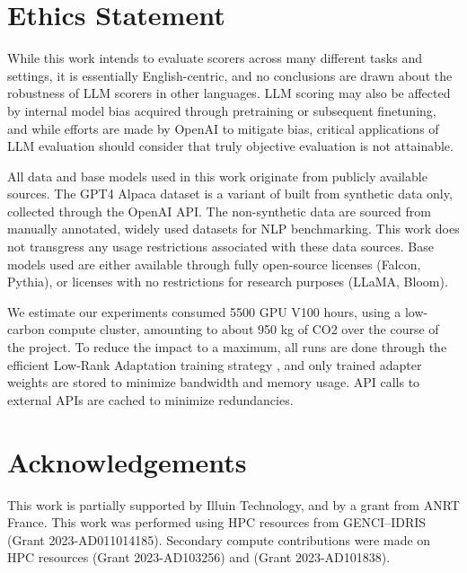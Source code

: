 \section*{Ethics Statement}

While this work intends to evaluate scorers across many different tasks and settings, it is essentially English-centric, and no conclusions are drawn about the robustness of LLM scorers in other languages. LLM scoring may also be affected by internal model bias acquired through pretraining or subsequent finetuning, and while efforts are made by OpenAI to mitigate bias, critical applications of LLM evaluation should consider that truly objective evaluation is not attainable.

All data and base models used in this work originate from publicly available sources. The GPT4 Alpaca dataset is a variant of  built from synthetic data only, collected through the OpenAI API. The non-synthetic data are sourced from manually annotated, widely used datasets for NLP benchmarking. This work does not transgress any usage restrictions associated with these data sources. Base models used are either available through fully open-source licenses (Falcon, Pythia), or licenses with no restrictions for research purposes (LLaMA, Bloom). 

We estimate our experiments consumed 5500 GPU V100 hours, using a low-carbon compute cluster, amounting to about 950 kg of CO2 over the course of the project.  To reduce the impact to a maximum, all runs are done through the efficient Low-Rank Adaptation training strategy , and only trained adapter weights are stored to minimize bandwidth and memory usage. API calls to external APIs are cached to minimize redundancies.


\section*{Acknowledgements}
This work is partially supported by Illuin Technology, and by a grant from ANRT France.
This work was performed using HPC resources from GENCI–IDRIS (Grant 2023-AD011014185).
Secondary compute contributions were made on HPC resources (Grant 2023-AD103256) and (Grant 2023-AD101838).

